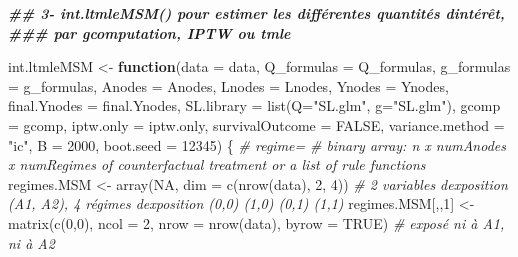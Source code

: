 \documentclass[
]{book}
\newenvironment{Shaded}{\begin{snugshade}}{\end{snugshade}}
\newcommand{\AttributeTok}[1]{\textcolor[rgb]{0.77,0.63,0.00}{#1}}
\newcommand{\CommentTok}[1]{\textcolor[rgb]{0.56,0.35,0.01}{\textit{#1}}}
\newcommand{\ConstantTok}[1]{\textcolor[rgb]{0.00,0.00,0.00}{#1}}
\newcommand{\ControlFlowTok}[1]{\textcolor[rgb]{0.13,0.29,0.53}{\textbf{#1}}}
\newcommand{\DecValTok}[1]{\textcolor[rgb]{0.00,0.00,0.81}{#1}}
\newcommand{\DocumentationTok}[1]{\textcolor[rgb]{0.56,0.35,0.01}{\textbf{\textit{#1}}}}
\newcommand{\FunctionTok}[1]{\textcolor[rgb]{0.00,0.00,0.00}{#1}}
\newcommand{\NormalTok}[1]{#1}
\newcommand{\OtherTok}[1]{\textcolor[rgb]{0.56,0.35,0.01}{#1}}
\newcommand{\StringTok}[1]{\textcolor[rgb]{0.31,0.60,0.02}{#1}}
\begin{document}
\begin{Shaded}
\begin{Highlighting}[]
\DocumentationTok{\#\# 3{-} int.ltmleMSM()          pour estimer les différentes quantités d\textquotesingle{}intérêt,}
\DocumentationTok{\#\#\#                           par gcomputation, IPTW ou tmle}

\NormalTok{int.ltmleMSM }\OtherTok{\textless{}{-}} \ControlFlowTok{function}\NormalTok{(}\AttributeTok{data =}\NormalTok{ data,}
                         \AttributeTok{Q\_formulas =}\NormalTok{ Q\_formulas,}
                         \AttributeTok{g\_formulas =}\NormalTok{ g\_formulas,}
                         \AttributeTok{Anodes =}\NormalTok{ Anodes,}
                         \AttributeTok{Lnodes =}\NormalTok{ Lnodes,}
                         \AttributeTok{Ynodes =}\NormalTok{ Ynodes,}
                         \AttributeTok{final.Ynodes =}\NormalTok{ final.Ynodes,}
                         \AttributeTok{SL.library =} \FunctionTok{list}\NormalTok{(}\AttributeTok{Q=}\StringTok{"SL.glm"}\NormalTok{,}
                                           \AttributeTok{g=}\StringTok{"SL.glm"}\NormalTok{),}
                         \AttributeTok{gcomp =}\NormalTok{ gcomp,}
                         \AttributeTok{iptw.only =}\NormalTok{ iptw.only,}
                         \AttributeTok{survivalOutcome =} \ConstantTok{FALSE}\NormalTok{,}
                         \AttributeTok{variance.method =} \StringTok{"ic"}\NormalTok{,}
                         \AttributeTok{B =} \DecValTok{2000}\NormalTok{,}
                         \AttributeTok{boot.seed =} \DecValTok{12345}\NormalTok{) \{}
  \CommentTok{\# regime=}
  \CommentTok{\# binary array: n x numAnodes x numRegimes of counterfactual treatment or a list of \textquotesingle{}rule\textquotesingle{} functions}
\NormalTok{  regimes.MSM }\OtherTok{\textless{}{-}} \FunctionTok{array}\NormalTok{(}\ConstantTok{NA}\NormalTok{, }\AttributeTok{dim =} \FunctionTok{c}\NormalTok{(}\FunctionTok{nrow}\NormalTok{(data), }\DecValTok{2}\NormalTok{, }\DecValTok{4}\NormalTok{)) }\CommentTok{\# 2 variables d\textquotesingle{}exposition (A1, A2), 4 régimes d\textquotesingle{}exposition (0,0) (1,0) (0,1) (1,1)}
\NormalTok{  regimes.MSM[,,}\DecValTok{1}\NormalTok{] }\OtherTok{\textless{}{-}} \FunctionTok{matrix}\NormalTok{(}\FunctionTok{c}\NormalTok{(}\DecValTok{0}\NormalTok{,}\DecValTok{0}\NormalTok{), }\AttributeTok{ncol =} \DecValTok{2}\NormalTok{, }\AttributeTok{nrow =} \FunctionTok{nrow}\NormalTok{(data), }\AttributeTok{byrow =} \ConstantTok{TRUE}\NormalTok{) }\CommentTok{\# exposé ni à A1, ni à A2}

\end{Highlighting}
\end{Shaded}
\end{document}
